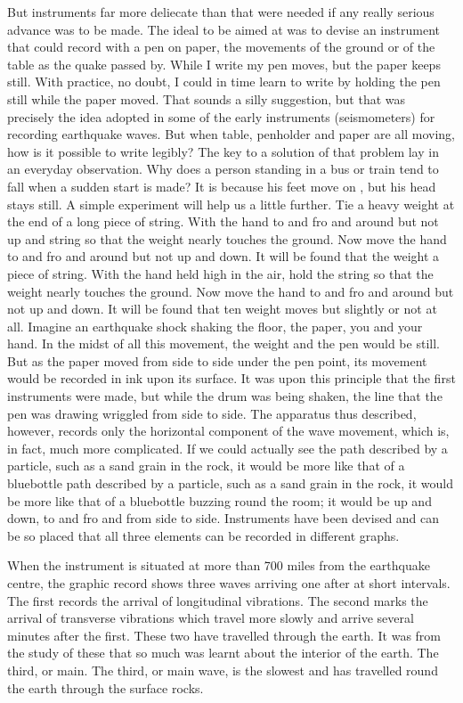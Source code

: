 \documentclass[11pt]{article}
\begin{document}
But instruments far more deliecate than that were needed if any really serious advance was to be made. The ideal to be aimed at was to devise an instrument that could record with a pen on paper, the movements of the ground or of the table as the quake passed by. While I write my pen moves, but the paper keeps still. With practice, no doubt, I could in time learn to write by holding the pen still while the paper moved. That sounds a silly suggestion, but that was precisely the idea adopted in some of the early instruments (seismometers) for recording earthquake waves. But when table, penholder and paper are all moving, how is it possible to write legibly? The key to a solution of that problem lay in an everyday observation. Why does a person standing in a bus or train tend to fall when a sudden start is made? It is because his feet move on , but his head stays still. A simple experiment will help us a little further. Tie a heavy weight at the end of a long piece of string. With the hand to and fro and around but not up and string so that the weight nearly touches the ground. Now move the hand to and fro and around but not up and down. It will be found that the weight a piece of string. With the hand held high in the air, hold the string so that the weight nearly touches the ground. Now move the hand to and fro and around but not up and down. It will be found that ten weight moves but slightly or not at all. Imagine an earthquake shock shaking the floor, the paper, you and your hand. In the midst of all this movement, the weight and the pen would be still. But as the paper moved from side to side under the pen point, its movement would be recorded in ink upon its surface. It was upon this principle that the first instruments were made, but while the drum was being shaken, the line that the pen was drawing wriggled from side to side. The apparatus thus described, however, records only the horizontal component of the wave movement, which is, in fact, much more complicated. If we could actually see the path described by a particle, such as a sand grain in the rock, it would be more like that of a bluebottle path described by a particle, such as a sand grain in the rock, it would be more like that of a bluebottle buzzing round the room; it would be up and down, to and fro and from side to side. Instruments have been devised and can be so placed that all three elements can be recorded in different graphs.

When the instrument is situated at more than 700 miles from the earthquake centre, the graphic record shows three waves arriving one after at short intervals. The first records the arrival of longitudinal vibrations. The second marks the arrival of transverse vibrations which travel more slowly and arrive several minutes after the first. These two have travelled through the earth. It was from the study of these that so much was learnt about the interior of the earth. The third, or main. The third, or main wave, is the slowest and has travelled round the earth through the surface rocks.
\end{document}
